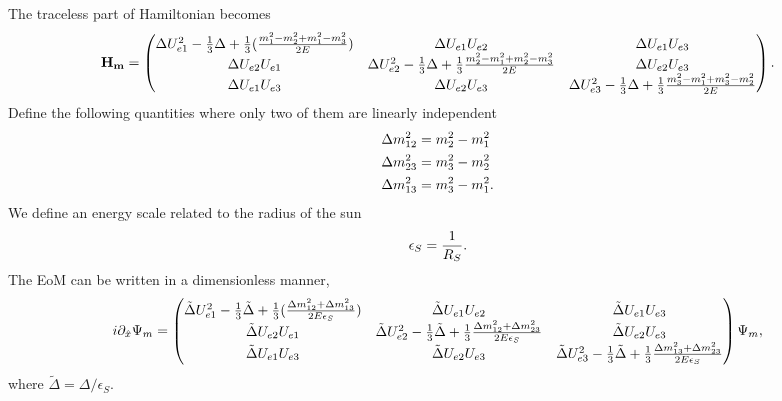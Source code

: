 \documentclass[letterpaper,12pt,english]{sphinxmanual}
\begin{document}
The traceless part of Hamiltonian becomes
\begin{gather}
\begin{split}\mathbf{H_{m}} = \begin{pmatrix}
\Delta U_{e1}^2 - \frac{1}{3}\Delta + \frac{1}{3}(\frac{m_1^2-m_2^2 + m_1^2-m_3^2}{2E}) & \Delta U_{e1}U_{e2} & \Delta U_{e1} U_{e3} \\
\Delta U_{e2} U_{e1} & \Delta U_{e2}^2 -\frac{1}{3}\Delta + \frac{1}{3}\frac{m_2^2 - m_1^2+m_2^2-m_3^2}{2E} & \Delta U_{e2}U_{e3} \\
\Delta U_{e1} U_{e3} & \Delta U_{e2} U_{e3} & \Delta U_{e3}^2 -\frac{1}{3} \Delta + \frac{1}{3} \frac{m_3^2 - m_1^2 + m_3^2-m_2^2 }{2E}
\end{pmatrix}.\end{split}\notag
\end{gather}
Define the following quantities where only two of them are linearly independent
\begin{gather}
\begin{split}\Delta m_{12}^2 & = m_2^2 - m_1^2 \\
\Delta m_{23}^2 & = m_3^2 - m_2^2 \\
\Delta m_{13}^2 & = m_3^2 - m_1^2.\end{split}\notag
\end{gather}
We define an energy scale related to the radius of the sun
\begin{gather}
\begin{split}\epsilon_S = \frac{1}{R_S}.\end{split}\notag
\end{gather}
The EoM can be written in a dimensionless manner,
\begin{gather}
\begin{split}i\partial_{\hat x} \Psi_{m} =  \begin{pmatrix}
\tilde\Delta U_{e1}^2 - \frac{1}{3}\tilde\Delta + \frac{1}{3}(\frac{\Delta m_{12}^2 + \Delta m_{13}^2}{2E\epsilon_S}) & \tilde\Delta U_{e1}U_{e2} & \tilde\Delta U_{e1} U_{e3} \\
\tilde\Delta U_{e2} U_{e1} & \tilde\Delta U_{e2}^2 -\frac{1}{3}\tilde\Delta + \frac{1}{3}\frac{\Delta m_{12}^2 + \Delta m_{23}^2}{2E\epsilon_S} & \tilde\Delta U_{e2}U_{e3} \\
\tilde\Delta U_{e1} U_{e3} & \tilde\Delta U_{e2} U_{e3} & \tilde\Delta U_{e3}^2 -\frac{1}{3} \tilde\Delta + \frac{1}{3} \frac{\Delta m_{13}^2 + \Delta m_{23}^2 }{2E\epsilon_S}
\end{pmatrix}\Psi_m ,\end{split}\notag
\end{gather}
where \(\tilde\Delta = \Delta/\epsilon_S\).
\end{document}

